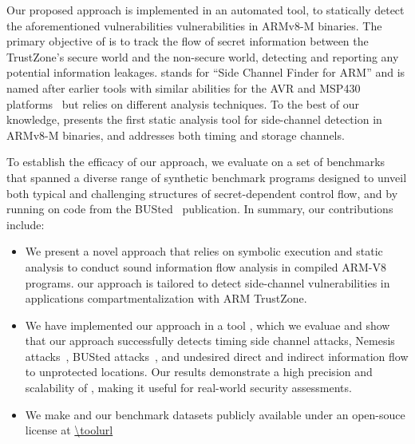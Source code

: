 Our proposed approach is implemented in an automated tool, \tool{} to
statically detect the aforementioned vulnerabilities vulnerabilities in
ARMv8-M binaries. The primary objective of \tool{} is to track the flow of
secret information between the TrustZone's secure world and the non-secure
world, detecting and reporting any potential information leakages. \tool{}
stands for ``Side Channel Finder for ARM'' and is named after earlier tools
with similar abilities for the AVR and MSP430 platforms~\cite{scfmsp,
MantelAVR} but relies on different analysis techniques.  To the best of our
knowledge, \tool{} presents the first static analysis tool for side-channel
detection in ARMv8-M binaries, and addresses both timing and storage
channels. 

To establish the efficacy of our approach, we evaluate \tool{} on a set of
benchmarks that spanned a diverse range of synthetic benchmark programs
designed to unveil both typical and challenging structures of
secret-dependent control flow,
%
%
and by running \tool{} on code from the BUSted~\cite{busted} publication.
In summary, our contributions include:

\begin{itemize}
%
  \item{We present a novel approach that relies on symbolic execution and
static analysis to conduct sound information flow analysis in compiled
ARM-V8 programs. our approach is tailored to detect side-channel
vulnerabilities in applications compartmentalization with ARM TrustZone.}
%
  \item{We have implemented our approach in a tool \tool{}, which we
evaluae and show that our approach successfully detects  timing side
channel attacks, Nemesis attacks~\cite{Nemesis}, BUSted
attacks~\cite{busted}, and undesired direct and indirect information flow
to unprotected locations. Our results demonstrate a high precision and
scalability of \tool{}, making it useful for real-world security
assessments.}
%
  \item{We make \tool{} and our benchmark datasets publicly available under
an open-souce license at \url{\toolurl}
%
 }
%
\end{itemize}

